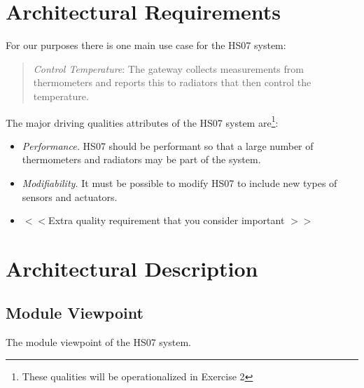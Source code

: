 \documentclass[a4paper,10pt]{article}
\begin{document}
\section{Architectural Requirements}

For our purposes there is one main use case for the HS07 system:
\begin{quote}
  \emph{Control Temperature}: The gateway collects measurements from
  thermometers and reports this to radiators that then control the
  temperature.
\end{quote}

The major driving qualities attributes of the HS07 system
are\footnote{These qualities will be operationalized in Exercise 2}:

\begin{itemize}
\item \emph{Performance.} HS07 should be performant so that a large
  number of thermometers and radiators may be part of the system.
\item \emph{Modifiability.} It must be possible to modify HS07 to
  include new types of sensors and actuators.
  \item $<<$Extra quality requirement that you consider important $>>$
\end{itemize}


\section{Architectural Description}

\subsection{Module Viewpoint}

The module viewpoint of the HS07 system.
\end{document}
